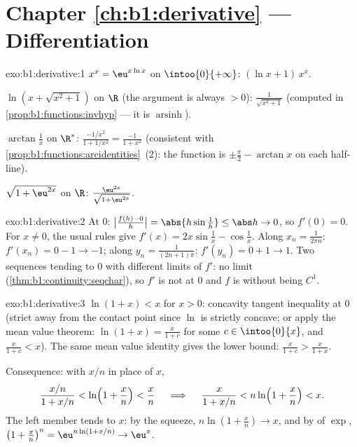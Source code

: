 \section*{Chapter \ref{ch:b1:derivative} --- Differentiation}

\begin{solution}{exo:b1:derivative:1}
$x^x = \eu^{x\ln x}$ on $\intoo{0}{+\infty}$:  $(\ln x +
1)\,x^x$.

$\ln(x + \sqrt{x^2+1})$ on $\R$ (the argument is always $> 0$):
 $\frac{1}{\sqrt{x^2+1}}$ (computed in
\cref{prop:b1:functions:invhyp} --- it is
$\operatorname{arsinh}$).

$\arctan\frac1x$ on $\R^*$:  $\frac{-1/x^2}{1 + 1/x^2} =
\frac{-1}{1 + x^2}$ (consistent with
\cref{prop:b1:functions:arcidentities}~(2): the function is
$\pm\frac\pi2 - \arctan x$ on each half-line).

$\sqrt{1 + \eu^{2x}}$ on $\R$: 
$\frac{\eu^{2x}}{\sqrt{1 + \eu^{2x}}}$.
\end{solution}

\begin{solution}{exo:b1:derivative:2}
At $0$: $\bigl|\frac{f(h) - 0}{h}\bigr| = \abs{h \sin\frac1h} \leq
\abs h \to 0$, so $f'(0) = 0$. For $x \neq 0$, the usual rules give
$f'(x) = 2x\sin\frac1x - \cos\frac1x$. Along $x_n = \frac{1}{2\pi
n}$: $f'(x_n) = 0 - 1 \to -1$; along $y_n = \frac{1}{(2n+1)\pi}$:
$f'(y_n) = 0 + 1 \to 1$. Two sequences tending to $0$ with different
limits of $f'$: no limit (\cref{thm:b1:continuity:seqchar}), so $f'$
is not  at $0$ and $f$ is  without being
$C^1$.
\end{solution}

\begin{solution}{exo:b1:derivative:3}
$\ln(1+x) < x$ for $x > 0$: concavity tangent inequality at $0$
(strict away from the contact point since $\ln$ is strictly concave;
or apply the mean value theorem: $\ln(1+x) = \frac{x}{1+c}$ for some
$c \in \intoo{0}{x}$, and $\frac{x}{1+c} < x$). The same mean value
identity gives the lower bound: $\frac{x}{1+c} > \frac{x}{1+x}$.

Consequence: with $x/n$ in place of $x$,
\[
\frac{x/n}{1 + x/n} < \ln\Bigl(1 + \frac xn\Bigr) < \frac xn
\quad\implies\quad
\frac{x}{1 + x/n} < n \ln\Bigl(1 + \frac xn\Bigr) < x .
\]
The left member tends to $x$: by the squeeze, $n\ln(1 + \frac xn)
\to x$, and by  of $\exp$, $\bigl(1 + \frac xn\bigr)^n =
\eu^{n\ln(1 + x/n)} \to \eu^x$.
\end{solution}

